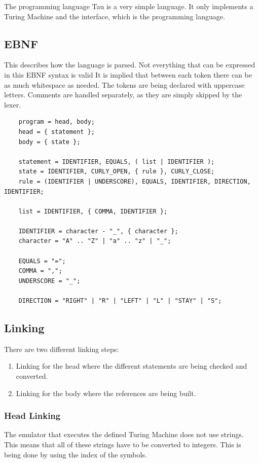 The programming language Tau is a very simple language. It only implements a Turing Machine and the interface, which is the programming language.

\subsection{EBNF}
This describes how the language is parsed. Not everything that can be expressed in this EBNF syntax is valid
It is implied that between each token there can be as much whitespace as needed. 
The tokens are being declared with uppercase letters. Comments are handled separately, as they are simply skipped by the lexer.

\begin{verbatim}
    program = head, body;
    head = { statement };
    body = { state };

    statement = IDENTIFIER, EQUALS, ( list | IDENTIFIER );
    state = IDENTIFIER, CURLY_OPEN, { rule }, CURLY_CLOSE;
    rule = (IDENTIFIER | UNDERSCORE), EQUALS, IDENTIFIER, DIRECTION, IDENTIFIER;

    list = IDENTIFIER, { COMMA, IDENTIFIER };

    IDENTIFIER = character - "_", { character };
    character = "A" .. "Z" | "a" .. "z" | "_";

    EQUALS = "=";
    COMMA = ",";
    UNDERSCORE = "_";

    DIRECTION = "RIGHT" | "R" | "LEFT" | "L" | "STAY" | "S";
\end{verbatim}

\subsection{Linking}
There are two different linking steps:
\begin{enumerate}
    \item Linking for the head where the different statements are being checked and converted.
    \item Linking for the body where the references are being built.
\end{enumerate}

\subsubsection{Head Linking}
The emulator that executes the defined Turing Machine does not use strings. 
This means that all of these strings have to be converted to integers. 
This is being done by using the index of the symbols.

